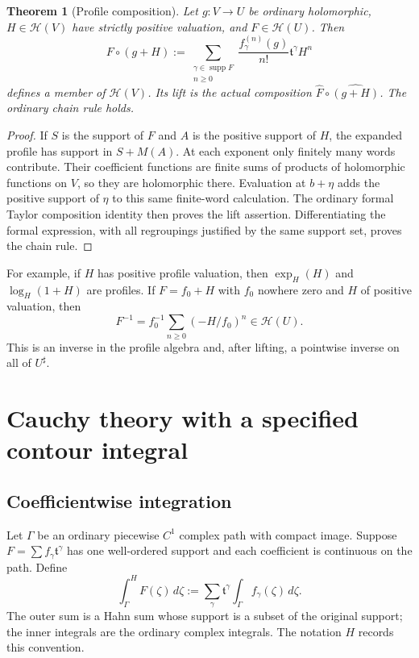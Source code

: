 \documentclass[11pt,a4paper]{article}
\numberwithin{equation}{section}
\newtheorem{theorem}{Theorem}[section]
\theoremstyle{definition}
\newcommand{\tmon}{\mathfrak t}
\newcommand{\HH}{\mathscr H}
\newcommand{\supp}{\operatorname{supp}}
\newcommand{\hhat}[1]{\widehat{#1}}
\newcommand{\hint}{\int^{\!H}}
\begin{document}
\begin{theorem}[Profile composition]\label{thm:profilecomposition}
Let $g:V\to U$ be ordinary holomorphic, $H\in\HH(V)$ have strictly positive
valuation, and $F\in\HH(U)$. Then
\begin{equation}\label{eq:profilecomp}
 F\circ(g+H):=
 \sum_{\substack{\gamma\in\supp F\\n\geq0}}
 \frac{f_\gamma^{(n)}(g)}{n!}\tmon^\gamma H^n
\end{equation}
defines a member of $\HH(V)$. Its lift is the actual composition
$\hhat F\circ\hhat{(g+H)}$. The ordinary chain rule holds.
\end{theorem}
\begin{proof}
If $S$ is the support of $F$ and $A$ is the positive support of $H$, the
expanded profile has support in $S+M(A)$. At each exponent only finitely many
words contribute. Their coefficient functions are finite sums of products
of holomorphic functions on $V$, so they are holomorphic there.
Evaluation at $b+\eta$ adds the positive support of $\eta$ to this same
finite-word calculation. The ordinary formal Taylor composition identity
then proves the lift assertion. Differentiating the formal expression, with
all regroupings justified by the same support set, proves the chain rule.
\end{proof}

For example, if $H$ has positive profile valuation, then
$\exp_H(H)$ and $\log_H(1+H)$ are profiles. If
$F=f_0+H$ with $f_0$ nowhere zero and $H$ of positive valuation, then
\begin{equation}\label{eq:profileinverse}
 F^{-1}=f_0^{-1}\sum_{n\geq0}(-H/f_0)^n\in\HH(U).
\end{equation}
This is an inverse in the profile algebra and, after lifting, a pointwise
inverse on all of $U^\sharp$.

\section{Cauchy theory with a specified contour integral}

\subsection{Coefficientwise integration}

Let $\Gamma$ be an ordinary piecewise $C^1$ complex path with compact image.
Suppose $F=\sum f_\gamma\tmon^\gamma$ has one well-ordered support and each
coefficient is continuous on the path. Define
\begin{equation}\label{eq:integral}
 \hint_\Gamma F(\zeta)\,d\zeta
 :=\sum_\gamma\tmon^\gamma
     \int_\Gamma f_\gamma(\zeta)\,d\zeta.
\end{equation}
The outer sum is a Hahn sum whose support is a subset of the original support;
the inner integrals are the ordinary complex integrals. The notation $H$
records this convention.
\end{document}
